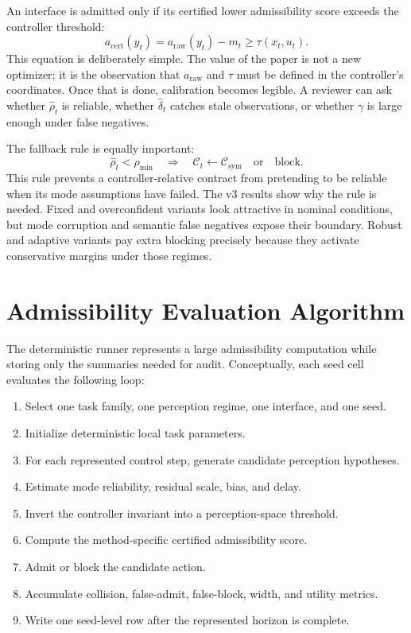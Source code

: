 \documentclass{article}
\newcommand{\x}{x}
\newcommand{\uvec}{u}
\newcommand{\contract}{\mathcal{C}}
\begin{document}
An interface is admitted only if its certified lower admissibility score exceeds the controller threshold:
\begin{equation}
    a_{\mathrm{cert}}(y_t)
    =
    a_{\mathrm{raw}}(y_t)-m_t
    \geq \tau(\x_t,\uvec_t).
\end{equation}
This equation is deliberately simple. The value of the paper is not a new optimizer; it is the observation that $a_{\mathrm{raw}}$ and $\tau$ must be defined in the controller's coordinates. Once that is done, calibration becomes legible. A reviewer can ask whether $\widehat{\rho}_t$ is reliable, whether $\widehat{\delta}_t$ catches stale observations, or whether $\gamma$ is large enough under false negatives.

The fallback rule is equally important:
\begin{equation}
    \widehat{\rho}_t<\rho_{\min}
    \quad\Rightarrow\quad
    \contract_t \leftarrow
    \contract_{\mathrm{sym}}
    \quad\mathrm{or}\quad
    \mathrm{block}.
\end{equation}
This rule prevents a controller-relative contract from pretending to be reliable when its mode assumptions have failed. The v3 results show why the rule is needed. Fixed and overconfident variants look attractive in nominal conditions, but mode corruption and semantic false negatives expose their boundary. Robust and adaptive variants pay extra blocking precisely because they activate conservative margins under those regimes.

\section{Admissibility Evaluation Algorithm}

The deterministic runner represents a large admissibility computation while storing only the summaries needed for audit. Conceptually, each seed cell evaluates the following loop:
\begin{enumerate}
    \item Select one task family, one perception regime, one interface, and one seed.
    \item Initialize deterministic local task parameters.
    \item For each represented control step, generate candidate perception hypotheses.
    \item Estimate mode reliability, residual scale, bias, and delay.
    \item Invert the controller invariant into a perception-space threshold.
    \item Compute the method-specific certified admissibility score.
    \item Admit or block the candidate action.
    \item Accumulate collision, false-admit, false-block, width, and utility metrics.
    \item Write one seed-level row after the represented horizon is complete.
\end{enumerate}
\end{document}
